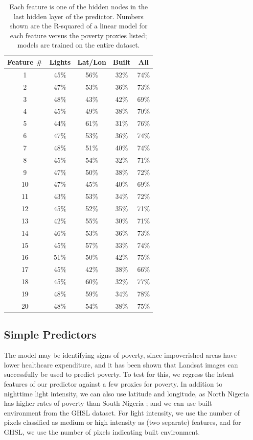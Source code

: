 \documentclass[]{article}
\begin{document}
\begin{table}[t!]
\centering
\begin{tabular}{c|cccc}
\hline
Feature \# & Lights & Lat/Lon & Built & All \\
\hline
1&45\%&56\%&32\%&74\%\\
2&47\%&53\%&36\%&73\%\\
3&48\%&43\%&42\%&69\%\\
4&45\%&49\%&38\%&70\%\\
5&44\%&61\%&31\%&76\%\\
6&47\%&53\%&36\%&74\%\\
7&48\%&51\%&40\%&74\%\\
8&45\%&54\%&32\%&71\%\\
9&47\%&50\%&38\%&72\%\\
10&47\%&45\%&40\%&69\%\\
11&43\%&53\%&34\%&72\%\\
12&45\%&52\%&35\%&71\%\\
13&42\%&55\%&30\%&71\%\\
14&46\%&53\%&36\%&73\%\\
15&45\%&57\%&33\%&74\%\\
16&51\%&50\%&42\%&75\%\\
17&45\%&42\%&38\%&66\%\\
18&45\%&60\%&32\%&77\%\\
19&48\%&59\%&34\%&78\%\\
20&48\%&54\%&38\%&75\%\\
\hline
\end{tabular}
\caption{Each feature is one of the hidden nodes in the last hidden layer of the predictor. Numbers shown are the R-squared of a linear model for each feature versus the poverty proxies listed; models are trained on the entire dataset.}
\label{table:features}
\end{table}
\subsection{Simple Predictors}
The model may be identifying signs of poverty, since impoverished areas have lower healthcare expenditure, and it has been shown that Landsat images can successfully be used to predict poverty. To test for this, we regress the latent features of our predictor against a few proxies for poverty. In addition to nighttime light intensity, we can also use latitude and longitude, as North Nigeria has higher rates of poverty than South Nigeria \cite{nigeriapoverty}; and we can use built environment from the GHSL dataset. For light intensity, we use the number of pixels classified as medium or high intensity as (two separate) features, and for GHSL, we use the number of pixels indicating built environment.
\end{document}

